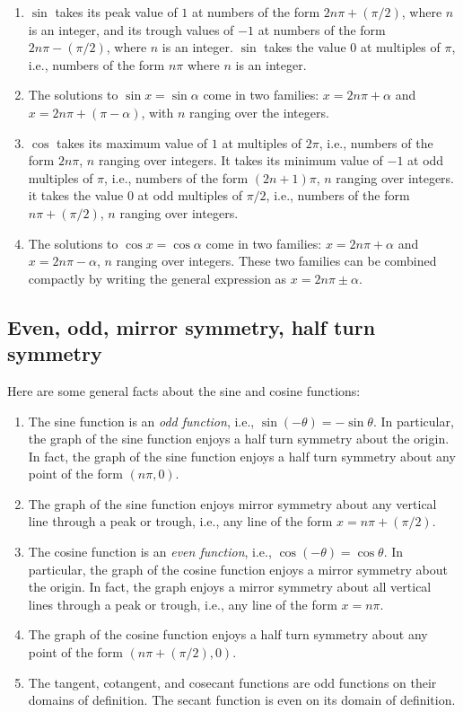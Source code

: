 \documentclass{amsart}
\begin{document}
\begin{enumerate}
\item $\sin$ takes its peak value of $1$ at numbers of the form
  $2n\pi + (\pi/2)$, where $n$ is an integer, and its trough values of
  $-1$ at numbers of the form $2n\pi - (\pi/2)$, where $n$ is an
  integer. $\sin$ takes the value $0$ at multiples of $\pi$, i.e.,
  numbers of the form $n\pi$ where $n$ is an integer.
\item The solutions to $\sin x = \sin \alpha$ come in two families: $x
  = 2n\pi + \alpha$ and $x = 2n\pi + (\pi - \alpha)$, with $n$ ranging
  over the integers.
\item $\cos$ takes its maximum value of $1$ at multiples of $2\pi$,
  i.e., numbers of the form $2n\pi$, $n$ ranging over integers. It
  takes its minimum value of $-1$ at odd multiples of $\pi$, i.e.,
  numbers of the form $(2n + 1)\pi$, $n$ ranging over integers. it
  takes the value $0$ at odd multiples of $\pi/2$, i.e., numbers of
  the form $n\pi + (\pi/2)$, $n$ ranging over integers.
\item The solutions to $\cos x = \cos \alpha$ come in two families: $x
  = 2n\pi + \alpha$ and $x = 2n\pi - \alpha$, $n$ ranging over
  integers. These two families can be combined compactly by writing
  the general expression as $x = 2n\pi \pm \alpha$.
\end{enumerate}

\subsection{Even, odd, mirror symmetry, half turn symmetry}

Here are some general facts about the sine and cosine functions:

\begin{enumerate}
\item The sine function is an {\em odd function}, i.e., $\sin(-\theta)
  = -\sin \theta$. In particular, the graph of the sine function
  enjoys a half turn symmetry about the origin. In fact, the graph of
  the sine function enjoys a half turn symmetry about any point of the
  form $(n\pi,0)$.
\item The graph of the sine function enjoys mirror symmetry about any
  vertical line through a peak or trough, i.e., any line of the form
  $x = n\pi + (\pi/2)$.
\item The cosine function is an {\em even function}, i.e.,
  $\cos(-\theta) = \cos \theta$. In particular, the graph of the
  cosine function enjoys a mirror symmetry about the origin. In fact,
  the graph enjoys a mirror symmetry about all vertical lines through
  a peak or trough, i.e., any line of the form $x = n\pi$.
\item The graph of the cosine function enjoys a half turn symmetry
  about any point of the form $(n\pi + (\pi/2),0)$.
\item The tangent, cotangent, and cosecant functions are odd functions
  on their domains of definition. The secant function is even on its
  domain of definition.
\end{enumerate}
\end{document}
